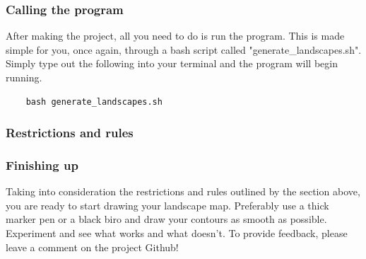 \documentclass[11pt]{article}
\begin{document}
\subsubsection{Calling the program}
After making the project, all you need to do is run the program. This
is made simple for you, once again, through a bash script called
"generate\_landscapes.sh". Simply type out the following into
your terminal and the program will begin running.

\begin{verbatim}
	bash generate_landscapes.sh
\end{verbatim}

\subsubsection{Restrictions and rules}


\subsubsection{Finishing up}
Taking into consideration the restrictions and rules outlined by the
section above, you are ready to start drawing your landscape map.
Preferably use a thick marker pen or a black biro and draw your
contours as smooth as possible. Experiment and see what works and what
doesn't. To provide feedback, please leave a comment on the project
Github!

\newpage



\end{document}
